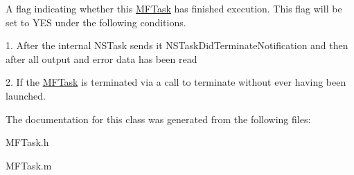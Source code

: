 A flag indicating whether this \hyperlink{interface_m_f_task}{MFTask} has finished execution. This flag will be set to YES under the following conditions. 

1. After the internal NSTask sends it NSTaskDidTerminateNotification and then after all output and error data has been read\par
 2. If the \hyperlink{interface_m_f_task}{MFTask} is terminated via a call to terminate without ever having been launched. 

The documentation for this class was generated from the following files:\begin{CompactItemize}
\item 
MFTask.h\item 
MFTask.m\end{CompactItemize}
